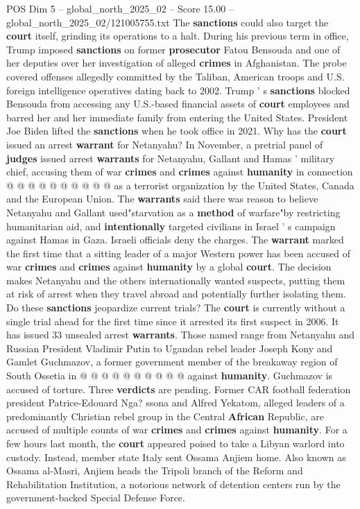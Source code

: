\begin{textsample}{POS Dim 5 – global\_north\_2025\_02 – Score 15.00 – global\_north\_2025\_02/121005755.txt}
The \textbf{sanctions} could also target the \textbf{court} itself, grinding its operations to a halt.
During his previous term in office, Trump imposed \textbf{sanctions} on former \textbf{prosecutor} Fatou Bensouda and one of her deputies over her investigation of alleged \textbf{crimes} in Afghanistan.
The probe covered offenses allegedly committed by the Taliban, American troops and U.S. foreign intelligence operatives dating back to 2002.
Trump ' s \textbf{sanctions} blocked Bensouda from accessing any U.S.-based financial assets of \textbf{court} employees and barred her and her immediate family from entering the United States.
President Joe Biden lifted the \textbf{sanctions} when he took office in 2021.
Why has the \textbf{court} issued an arrest \textbf{warrant} for Netanyahu?
In November, a pretrial panel of \textbf{judges} issued arrest \textbf{warrants} for Netanyahu, Gallant and Hamas ' military chief, accusing them of war \textbf{crimes} and \textbf{crimes} against \textbf{humanity} in connection @ @ @ @ @ @ @ @ @ @ as a terrorist organization by the United States, Canada and the European Union.
The \textbf{warrants} said there was reason to believe Netanyahu and Gallant used"starvation as a \textbf{method} of warfare"by restricting humanitarian aid, and \textbf{intentionally} targeted civilians in Israel ' s campaign against Hamas in Gaza.
Israeli officials deny the charges.
The \textbf{warrant} marked the first time that a sitting leader of a major Western power has been accused of war \textbf{crimes} and \textbf{crimes} against \textbf{humanity} by a global \textbf{court}.
The decision makes Netanyahu and the others internationally wanted suspects, putting them at risk of arrest when they travel abroad and potentially further isolating them.
Do these \textbf{sanctions} jeopardize current trials?
The \textbf{court} is currently without a single trial ahead for the first time since it arrested its first suspect in 2006.
It has issued 33 unsealed arrest \textbf{warrants}.
Those named range from Netanyahu and Russian President Vladimir Putin to Ugandan rebel leader Joseph Kony and Gamlet Guchmazov, a former government member of the breakaway region of South Ossetia in @ @ @ @ @ @ @ @ @ @ against \textbf{humanity}.
Guchmazov is accused of torture.
Three \textbf{verdicts} are pending.
Former CAR football federation president Patrice-Edouard Nga? ssona and Alfred Yekatom, alleged leaders of a predominantly Christian rebel group in the Central \textbf{African} Republic, are accused of multiple counts of war \textbf{crimes} and \textbf{crimes} against \textbf{humanity}.
For a few hours last month, the \textbf{court} appeared poised to take a Libyan warlord into custody.
Instead, member state Italy sent Ossama Anjiem home.
Also known as Ossama al-Masri, Anjiem heads the Tripoli branch of the Reform and Rehabilitation Institution, a notorious network of detention centers run by the government-backed Special Defense Force.

\end{textsample}
